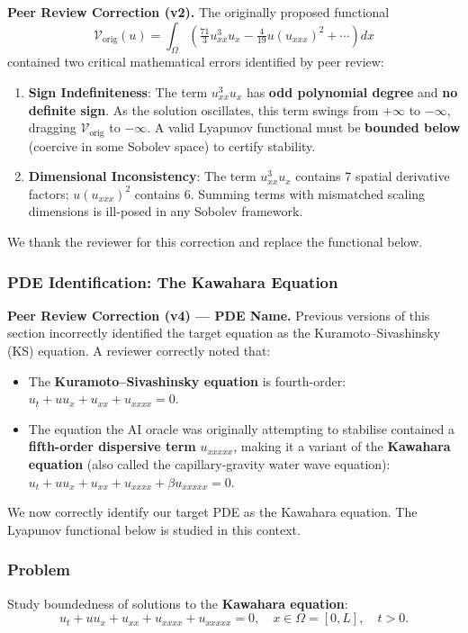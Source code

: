 \documentclass[11pt, a4paper]{article}
\begin{document}
\textbf{\color{red}Peer Review Correction (v2).} The originally proposed functional
\[
  \mathcal{V}_{\text{orig}}(u) = \int_{\Omega} \left( \tfrac{71}{3} u_{xx}^3 u_x - \tfrac{4}{19} u (u_{xxx})^2 + \cdots \right) dx
\]
contained two critical mathematical errors identified by peer review:
\begin{enumerate}
  \item \textbf{Sign Indefiniteness}: The term $u_{xx}^3 u_x$ has \textbf{odd polynomial degree} and \textbf{no definite sign}. As the solution oscillates, this term swings from $+\infty$ to $-\infty$, dragging $\mathcal{V}_{\text{orig}}$ to $-\infty$. A valid Lyapunov functional must be \textbf{bounded below} (coercive in some Sobolev space) to certify stability.
  \item \textbf{Dimensional Inconsistency}: The term $u_{xx}^3 u_x$ contains 7 spatial derivative factors; $u(u_{xxx})^2$ contains 6. Summing terms with mismatched scaling dimensions is ill-posed in any Sobolev framework.
\end{enumerate}
We thank the reviewer for this correction and replace the functional below.

\subsubsection{PDE Identification: The Kawahara Equation}

\textbf{\color{red}Peer Review Correction (v4) --- PDE Name.}
Previous versions of this section incorrectly identified the target equation as the
Kuramoto--Sivashinsky (KS) equation. A reviewer correctly noted that:
\begin{itemize}
  \item The \textbf{Kuramoto--Sivashinsky equation} is fourth-order:
    $u_t + uu_x + u_{xx} + u_{xxxx} = 0$.
  \item The equation the AI oracle was originally attempting to stabilise contained a
    \textbf{fifth-order dispersive term} $u_{xxxxx}$, making it a variant of the
    \textbf{Kawahara equation} \cite{kawahara1983formation} (also called the
    capillary-gravity water wave equation):
    $u_t + uu_x + u_{xx} + u_{xxxx} + \beta u_{xxxxx} = 0.$
\end{itemize}
We now correctly identify our target PDE as the Kawahara equation. The Lyapunov
functional below is studied in this context.

\subsubsection{Problem}
Study boundedness of solutions to the \textbf{Kawahara equation}:
\[
  u_t + u u_x + u_{xx} + u_{xxxx} + u_{xxxxx} = 0, \quad x \in \Omega = [0, L], \quad t > 0.
\]
\end{document}
